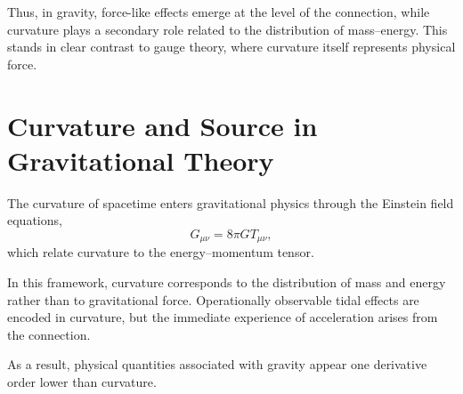 \documentclass[12pt,letterpaper]{article} %
\begin{document}
Thus, in gravity, force-like effects emerge at the level of the connection, while curvature plays a secondary role related to the distribution of mass--energy. This stands in clear contrast to gauge theory, where curvature itself represents physical force.


\section{Curvature and Source in Gravitational Theory}

\justifying
The curvature of spacetime enters gravitational physics through the Einstein field equations,
\begin{equation}
G_{\mu\nu} = 8\pi G T_{\mu\nu},
\end{equation}
which relate curvature to the energy--momentum tensor.

In this framework, curvature corresponds to the distribution of mass and energy rather than to gravitational force. Operationally observable tidal effects are encoded in curvature, but the immediate experience of acceleration arises from the connection.

As a result, physical quantities associated with gravity appear one derivative order lower than curvature.
\end{document}
